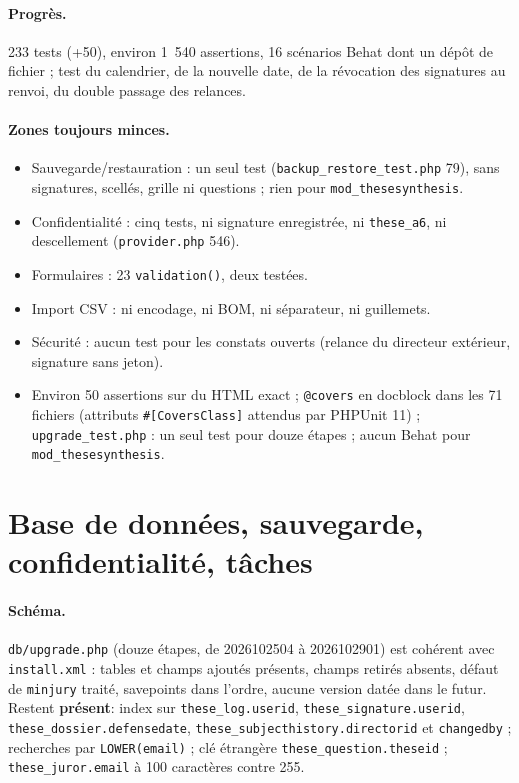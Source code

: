 \documentclass[11pt,a4paper]{article}
\newcommand{\fichier}[1]{\texttt{\small #1}}
\newcommand{\code}[1]{\texttt{#1}}
\newcommand{\present}{\textcolor{red!70!black}{\textbf{présent}}}
\begin{document}
\paragraph{Progrès.}
233 tests (+50), environ 1~540 assertions, 16 scénarios Behat dont un dépôt de fichier ; test
du calendrier, de la nouvelle date, de la révocation des signatures au renvoi, du double passage
des relances.

\paragraph{Zones toujours minces.}
\begin{itemize}
  \item Sauvegarde/restauration : un seul test (\fichier{backup\_restore\_test.php} 79), sans
    signatures, scellés, grille ni questions ; rien pour \code{mod\_thesesynthesis}.
  \item Confidentialité : cinq tests, ni signature enregistrée, ni \code{these\_a6}, ni
    descellement (\fichier{provider.php} 546).
  \item Formulaires : 23 \code{validation()}, deux testées.
  \item Import CSV : ni encodage, ni BOM, ni séparateur, ni guillemets.
  \item Sécurité : aucun test pour les constats ouverts (relance du directeur extérieur,
    signature sans jeton).
  \item Environ 50 assertions sur du HTML exact ; \code{@covers} en docblock dans les 71 fichiers
    (attributs \code{\#[CoversClass]} attendus par PHPUnit 11) ; \code{upgrade\_test.php} : un
    seul test pour douze étapes ; aucun Behat pour \code{mod\_thesesynthesis}.
\end{itemize}

\section{Base de données, sauvegarde, confidentialité, tâches}\label{sec:donnees}

\paragraph{Schéma.}
\fichier{db/upgrade.php} (douze étapes, de 2026102504 à 2026102901) est cohérent avec
\fichier{install.xml} : tables et champs ajoutés présents, champs retirés absents, défaut de
\code{minjury} traité, savepoints dans l'ordre, aucune version datée dans le futur. Restent
\present : index sur \code{these\_log.userid}, \code{these\_signature.userid},
\code{these\_dossier.defensedate}, \code{these\_subjecthistory.directorid} et \code{changedby} ;
recherches par \code{LOWER(email)} ; clé étrangère \code{these\_question.theseid} ;
\code{these\_juror.email} à 100 caractères contre 255.
\end{document}
